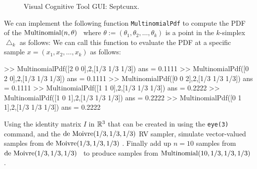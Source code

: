 \begin{figure}[htpb]
\caption{Visual Cognitive Tool GUI: Septcunx.\label{F:guiMultinomialSeptcunx}}
\centering   {}
\end{figure}


\begin{labwork}\label{LW:MultinomialPdf}
We can implement the following \Matlab function {\tt MultinomialPdf} to compute the PDF of the $\mbox{{\rm Multinomial}}(n,\theta)$ \rv~where $\theta:=(\theta_1,\theta_2,\ldots,\theta_k)$ is a point in the $k$-simplex $\bigtriangleup_k$ as follows:
We can call this function to evaluate the PDF at a specific sample $x=(x_1,x_2,\ldots,x_k)$ as follows:
\begin{VrbM}
>> MultinomialPdf([2 0 0],2,[1/3 1/3 1/3])
ans =    0.1111
>> MultinomialPdf([0 2 0],2,[1/3 1/3 1/3])
ans =    0.1111
>> MultinomialPdf([0 0 2],2,[1/3 1/3 1/3])
ans =    0.1111
>> MultinomialPdf([1 1 0],2,[1/3 1/3 1/3])
ans =    0.2222
>> MultinomialPdf([1 0 1],2,[1/3 1/3 1/3])
ans =    0.2222
>> MultinomialPdf([0 1 1],2,[1/3 1/3 1/3])
ans =    0.2222
\end{VrbM}
\end{labwork}

\begin{simulation}\label{SIM:Multinomial}
Using the identity matrix $I$ in $\mathbb{R}^3$ that can be created in \Matlab using the {\tt eye(3)} command, and the $\mbox{{\rm de~Moivre}}(1/3,1/3,1/3)$ RV sampler, simulate vector-valued samples from $\mbox{{\rm de~Moivre}}(1/3,1/3,1/3)$ \rv.  Finally add up $n=10$ samples from $\mbox{{\rm de~Moivre}}(1/3,1/3,1/3)$ \rv~to produce samples from $\mbox{{\rm Multinomial}}(10,1/3,1/3,1/3)$ \rv.
\end{simulation}

